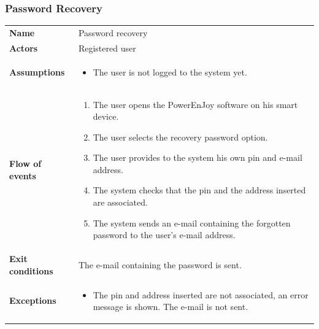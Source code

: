 \documentclass[english]{article}
\begin{document}
		\subsubsection{Password Recovery}
		\begin{center}
		\begin{tabular}{l||p{10cm}}
		\textbf{Name} 
			& Password recovery\\ [8px]
		\textbf{Actors} 
			& Registered user\\ [8px]
		\textbf{Assumptions} 
			& \begin{itemize}
				\item The user is not logged to the system yet.
			\end{itemize}\\
		\textbf{Flow of events}
			& \begin{enumerate}
	 			\item The user opens the PowerEnJoy software on his smart device.
				\item The user selects the recovery password option.
				\item The user provides to the system his own pin and e-mail address.
				\item The system checks that the pin and the address inserted are associated.
				\item The system sends an e-mail containing the forgotten password to the user's e-mail address.
			\end{enumerate}\\ 
		\textbf{Exit conditions}
			& The e-mail containing the password is sent.\\ [8px]
		\textbf{Exceptions}
			& \begin{itemize}
				\item The pin and address inserted are not associated, an error message is shown. The e-mail is not sent.
			\end{itemize}
		\end{tabular}
		\end{center}
		\noindent
\end{document}
